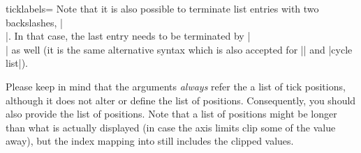 \begin{pgfplotsxykey}{\x ticklabels=}
    Note that it is also possible to terminate list entries with two
    backslashes, |\\|. In that case, the last entry needs to be terminated by
    |\\| as well (it is the same alternative syntax which is also accepted for
    |\legend| and |cycle list|).

    Please keep in mind that the arguments \emph{always} refer the a list of
    tick positions, although it does not alter or define the list of positions.
    Consequently, you should also provide the list of positions. Note that a
    list of positions might be longer than what is actually displayed (in case
    the axis limits clip some of the value away), but the index mapping into
     still includes the clipped values.
\end{pgfplotsxykey}


